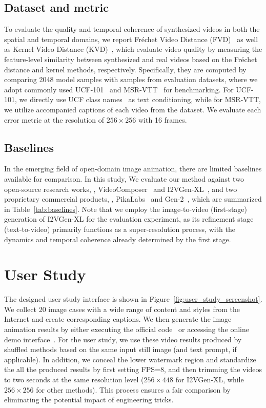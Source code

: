 \subsection{Dataset and metric}
To evaluate the quality and temporal coherence of synthesized videos in both the spatial and temporal domains, we report Fr\'echet Video Distance (FVD)~\cite{unterthiner2019fvd} as well as Kernel Video Distance (KVD)~\cite{unterthiner2019fvd}, which evaluate video quality by measuring the feature-level similarity between synthesized and real videos based on the Fr\'echet distance and kernel methods, respectively. 
Specifically, they are computed by comparing 2048 model samples with samples from evaluation datasets, where we adopt commonly used UCF-101~\cite{soomro2012ucf101} and MSR-VTT~\cite{xu2016msr} for benchmarking. For UCF-101, we directly use UCF class names~\cite{blattmann2023align} as text conditioning, while for MSR-VTT, we utilize accompanied captions of each video from the dataset. 
We evaluate each error metric at the resolution of $256\times 256$ with 16 frames.

\subsection{Baselines}
In the emerging field of open-domain image animation, there are limited baselines available for comparison. In this study, We evaluate our method against two open-source research works, \ie, VideoComposer~\cite{wang2023videocomposer} and I2VGen-XL~\cite{I2VGen-XL}, and two proprietary commercial products, \ie, PikaLabs~\cite{PikaLabs} and Gen-2~\cite{Gen-2}, which are summarized in Table~\ref{tab:baselines}. Note that we employ the image-to-video (first-stage) generation of I2VGen-XL for the evaluation experiment, as its refinement stage (text-to-video) primarily functions as a super-resolution process, with the dynamics and temporal coherence already determined by the first stage.



\section{User Study}
\label{sec:user_study}
The designed user study interface is shown in Figure~\ref{fig:user_study_screenshot}. We collect 20 image cases with a wide range of content and styles from the Internet and create corresponding captions. We then generate the image animation results by either executing the official code~\cite{wang2023videocomposer,I2VGen-XL} or accessing the online demo interface~\cite{Gen-2,PikaLabs}. For the user study, we use these video results produced by shuffled methods based on the same input still image (and text prompt, if applicable). In addition, we conceal the lower watermark region and standardize the all the produced results by first setting FPS=8, and then trimming the videos to two seconds at the same resolution level ($256\times 448$ for I2VGen-XL, while $256\times 256$ for other methods). This process ensures a fair comparison by eliminating the potential impact of engineering tricks. 

